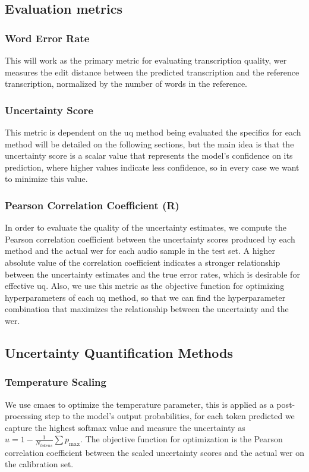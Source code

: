 \documentclass[11pt]{article}
\begin{document}
\subsection{Evaluation metrics}

\subsubsection{Word Error Rate}
This will work as the primary metric for evaluating transcription quality, \acrshort{wer} measures the edit distance between the predicted transcription and the reference transcription, normalized by the number of words in the reference.

\subsubsection{Uncertainty Score}
This metric is dependent on the \acrshort{uq} method being evaluated the specifics for each method will be detailed on the following sections, but the main idea is that the uncertainty score is a scalar value that represents the model's confidence on its prediction, where higher values indicate less confidence, so in every case we want to minimize this value.

\subsubsection{Pearson Correlation Coefficient (R)}
In order to evaluate the quality of the uncertainty estimates, we compute the Pearson correlation coefficient between the uncertainty scores produced by each method and the actual \acrshort{wer} for each audio sample in the test set. A higher absolute value of the correlation coefficient indicates a stronger relationship between the uncertainty estimates and the true error rates, which is desirable for effective \acrshort{uq}. 
Also, we use this metric as the objective function for optimizing hyperparameters of each \acrshort{uq} method, so that we can find the hyperparameter combination that maximizes the relationship between the uncertainty and the \acrshort{wer}.

\subsection{Uncertainty Quantification Methods}

\subsubsection{Temperature Scaling}
We use \acrshort{cmaes} to optimize the temperature parameter, this is applied as a post-processing step to the model's output probabilities, for each token predicted we capture the highest softmax value and measure the uncertainty as $u = 1 - \frac{1}{N_{tokens}}\sum p_{\text{max}}$. The objective function for optimization is the Pearson correlation coefficient between the scaled uncertainty scores and the actual \acrshort{wer} on the calibration set.
\end{document}
